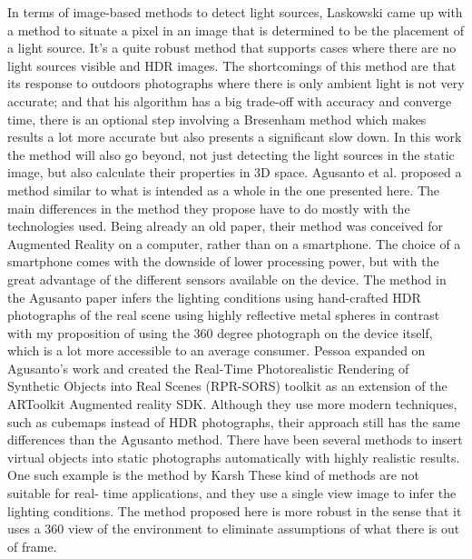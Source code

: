 
In terms of image-based methods to detect light sources, Laskowski\cite{Laskowski2007} came up with a method to situate a pixel in an image that is determined to be the placement of a light source. It's a quite robust method that supports cases where there are no light sources visible and HDR images. The shortcomings of this method are that its response to outdoors photographs where there is only ambient light is not very accurate; and that his algorithm has a big trade-off with accuracy and converge time, there is an optional step involving a Bresenham method which makes results a lot more accurate but also presents a significant slow down. In this work the method will also go beyond, not just detecting the light sources in the static image, but also calculate their properties in 3D space. 
Agusanto et al.\cite{agusanto2003} proposed a method similar to what is intended as a whole in the one presented here. The main differences in the method they propose have to do mostly with the technologies used. Being already an old paper, their method was conceived for Augmented Reality on a computer, rather than on a smartphone. The choice of a smartphone comes with the downside of lower processing power, but with the great advantage of the different sensors available on the device. The method in the Agusanto paper infers the lighting conditions using hand-crafted HDR photographs of the real scene using highly reflective metal spheres in contrast with my proposition of using the 360 degree photograph on the device itself, which is a lot more accessible to an average consumer.\newline
Pessoa\cite{pessoa2011} expanded on Agusanto's work and created the Real-Time Photorealistic Rendering of Synthetic Objects into Real Scenes (RPR-SORS) toolkit as an extension of the ARToolkit Augmented reality SDK. Although they use more modern techniques, such as cubemaps instead of HDR photographs, their approach still has the same differences than the Agusanto method.\newline
There have been several methods to insert virtual objects into static photographs automatically with highly realistic results. One such example is the method by Karsh \cite{karsh2014} These kind of methods are not suitable for real- time applications, and they use a single view image to infer the lighting conditions. The method proposed here is more robust in the sense that it uses a 360 view of the environment to eliminate assumptions of what there is out of frame.\newline
